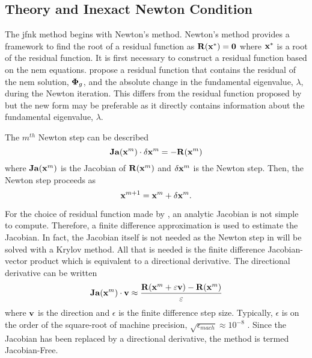   \subsection{ Theory and Inexact Newton Condition}

    The \gls{jfnk} method begins with Newton's method. Newton's method provides
    a framework to find the root of a residual function as $\mathbf{R}(\mathbf{x}^*) =
    \mathbf{0}$ where $\mathbf{x}^*$ is a root of the residual function. It is first
    necessary to construct a residual function based on the \gls{nem} equations.
    \citeauthor{qe2paper} propose a residual function that contains the residual
    of  the \gls{nem} solution, $\mathbf{\Phi}_g$, and the absolute change in the
    fundamental eigenvalue, $\lambda$, during the Newton iteration. This differs
    from the residual function proposed by \citeauthor{gill_azmy} but the new
    form may be preferable as it directly contains information about the
    fundamental eigenvalue, $\lambda$.
    
    The $m^{th}$ Newton step can be described 
    \begin{equation}
      \label{eq:newton_step}
      \mathbf{Ja} (\mathbf{x}^m) \cdot \delta\mathbf{x}^m = - \mathbf{R}(\mathbf{x}^m)
    \end{equation}
    where $\mathbf{Ja}(\mathbf{x}^m)$ is the Jacobian of $\mathbf{R}(\mathbf{x}^m)$ and 
    $\delta\mathbf{x}^m$ is the Newton step. Then, the Newton step proceeds as
    \begin{equation}
      \mathbf{x}^{m+1} = \mathbf{x}^{m} + \delta\mathbf{x}^{m}.
    \end{equation}

    For the choice of residual function made by \citeauthor{qe2paper}, an 
    analytic Jacobian is not simple to compute. Therefore, a finite difference
    approximation is used to estimate the Jacobian. In fact, the Jacobian itself
    is not needed as the Newton step in  will be solved
    with a Krylov method. All that is needed is the finite difference
    Jacobian-vector product which is equivalent to a directional derivative. The
    directional derivative can be written
    \begin{equation}
      \label{eq:dirder}
      \mathbf{Ja}(\mathbf{x}^m) \cdot \mathbf{v} \approx \frac{\mathbf{R}(\mathbf{x}^m + \varepsilon \mathbf{v}) - 
        \mathbf{R}(\mathbf{x}^m)}{\varepsilon}
    \end{equation}
    where $\mathbf{v}$ is the direction and $\epsilon$ is the finite difference step
    size. Typically, $\epsilon$ is on the order of the square-root of machine
    precision, $\sqrt{\epsilon_{mach}} \approx 10^{-8}$
    \cite{qe2paper,gill_azmy,textbookkelley}. Since the Jacobian has been
    replaced by a directional derivative, the method is termed Jacobian-Free.

